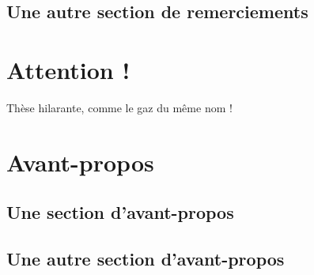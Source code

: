 \documentclass[12pt,space=onehalf,version=final]{yathesis}
\begin{document}
\section{Une autre section de remerciements}
\lipsum[2-9]
%
\chapter{Attention !}
Thèse hilarante, comme le gaz du même nom !
%
\begin{abstract}
  \lipsum[1-2]
\end{abstract}
\begin{abstract}
  \lipsum[3-4]
\end{abstract}
\makeabstract
%
\printacronyms
%
\printsymbols
%
\chapter{Avant-propos}
\section{Une section d'avant-propos}
\lipsum[30-45]
\section{Une autre section d'avant-propos}
\lipsum[30-35]
%
\tableofcontents[depth=chapter,name=Sommaire]
%
\listoftables
%
\listoffigures
%
%
\mainmatter
%

%
%
\end{document}
